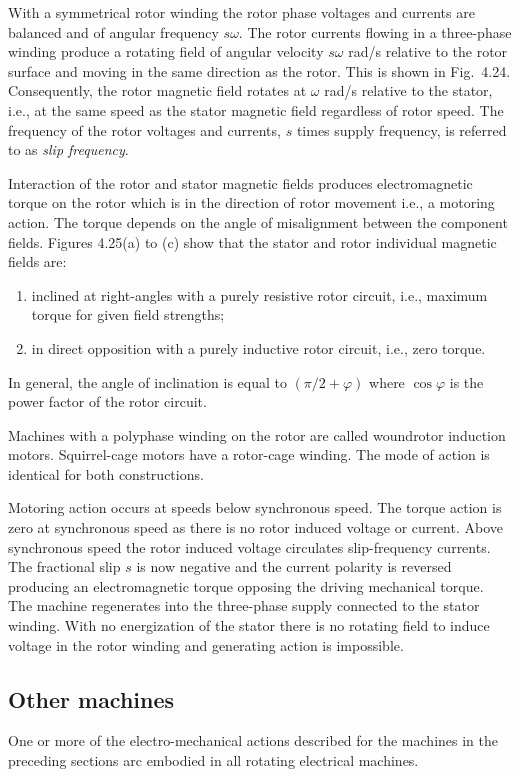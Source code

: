 \documentclass[a4paper,numbers=noenddot,12pt]{scrbook}
\begin{document}
With a symmetrical rotor winding the rotor phase voltages and currents are balanced and of angular frequency $s \omega$. The rotor currents flowing in a three-phase winding produce a rotating field of angular velocity $s \omega$ rad/s relative to the rotor surface and moving in the same direction as the rotor. This is shown in Fig.\ 4.24. Consequently, the rotor magnetic field rotates at $\omega$ rad/s relative to the stator, i.e., at the same speed as the stator magnetic field regardless of
rotor speed. The frequency of the rotor voltages and currents, $s$ times supply frequency, is referred to as \textit{slip frequency}.

Interaction of the rotor and stator magnetic fields produces electromagnetic torque on the rotor which is in the direction of rotor movement i.e., a motoring action. The torque depends on the angle of misalignment between the component fields. Figures 4.25(a) to (c) show that the stator and rotor individual magnetic fields are: 
\begin{enumerate}
    \item inclined at right-angles with a purely resistive rotor circuit, i.e., maximum torque for given field strengths; 
    \item in direct opposition with a purely inductive rotor circuit, i.e., zero torque. 
\end{enumerate}

In general, the angle of inclination is equal to $(\pi/2 + \varphi)$ where $\cos \varphi$ is the power factor of the rotor circuit.

Machines with a polyphase winding on the rotor are called wound­rotor induction motors. Squirrel-cage motors have a rotor-cage winding. The mode of action is identical for both constructions.

Motoring action occurs at speeds below synchronous speed. The torque action is zero at synchronous speed as there is no rotor induced voltage or current. Above synchronous speed the rotor induced voltage circulates slip-frequency currents. The fractional slip $s$ is now negative and the current polarity is reversed producing an electromagnetic torque opposing the driving mechanical torque. The machine regenerates into the three-phase supply connected to the stator winding. With no energization of the stator there is no rotating field to induce voltage in the rotor winding and generating action is impossible.

\subsection{Other machines}
One or more of the electro-mechanical actions described for the machines in the preceding sections arc embodied in all rotating electrical machines.
\end{document}
